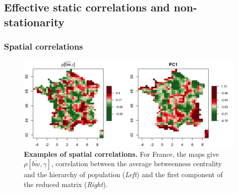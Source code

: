 \documentclass[11pt]{article}
\begin{document}
\subsection{Effective static correlations and non-stationarity}


\subsubsection{Spatial correlations}


\begin{figure}
\includegraphics[width=\linewidth]{4-1-3-fig-staticcorrs-mapscorrs}
\caption{\textbf{Examples of spatial correlations.} For France, the maps give $\rho\left[\bar{bw},\gamma\right]$, correlation between the average betweenness centrality and the hierarchy of population (\textit{Left}) and the first component of the reduced matrix (\textit{Right}).\label{fig:staticcorrs:mapscorrs}}
\end{figure}
\end{document}
